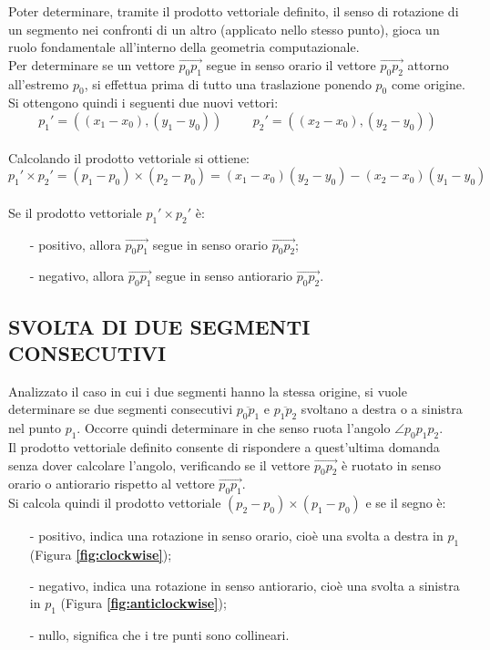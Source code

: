 \documentclass[12pt,a4paper]{report}
\begin{document}
Poter determinare, tramite il prodotto vettoriale definito, il senso di rotazione di un segmento nei confronti di un altro (applicato nello stesso punto), gioca un ruolo fondamentale all'interno della geometria computazionale.\\
Per determinare se un vettore $\overrightarrow{p_0p_1}$ segue in senso orario il vettore $\overrightarrow{p_0p_2}$ attorno all'estremo $p_0$, si effettua prima di tutto una traslazione ponendo $p_0$ come origine.\\
Si ottengono quindi i seguenti due nuovi vettori: 
\[ {p_1}' = ((x_1 - x_0),(y_1 - y_0))
\hspace{1cm}
{p_2}' = ((x_2 - x_0),(y_2 - y_0)) \]\\
Calcolando il prodotto vettoriale si ottiene:
\[{p_1}' \times {p_2}' = (p_1 - p_0) \times (p_2 - p_0) = (x_1 - x_0)(y_2 - y_0) - (x_2 - x_0)(y_1 - y_0)\]\\
Se il prodotto vettoriale ${p_1}' \times {p_2}'$ è:
\begin{itemize}
    \item[-] positivo, allora $\overrightarrow{p_0p_1}$ segue in senso orario $\overrightarrow{p_0p_2}$;
    \item[-] negativo, allora $\overrightarrow{p_0p_1}$ segue in senso antiorario $\overrightarrow{p_0p_2}$.
\end{itemize}

\pagebreak

\subsection*{\small{SVOLTA DI DUE SEGMENTI CONSECUTIVI}}
Analizzato il caso in cui i due segmenti hanno la stessa origine, si vuole determinare se due segmenti consecutivi $\overline{p_0p_1}$ e $\overline{p_1p_2}$ svoltano a destra o a sinistra nel punto $p_1$. Occorre quindi determinare in che senso ruota l'angolo $\angle p_0p_1p_2$.\\
Il prodotto vettoriale definito consente di rispondere a quest'ultima domanda senza dover calcolare l'angolo, verificando se il vettore $\overrightarrow{p_0p_2}$ è ruotato in senso orario o antiorario rispetto al vettore $\overrightarrow{p_0p_1}$.\\
Si calcola quindi il prodotto vettoriale $(p_2 - p_0) \times (p_1 - p_0)$ e se il segno è:
\begin{itemize}
    \item[-] positivo, indica una rotazione in senso orario, cioè una svolta a destra in $p_1$ (Figura \textbf{\ref{fig:clockwise}});
    \item[-] negativo, indica una rotazione in senso antiorario, cioè una svolta a sinistra in $p_1$ (Figura \textbf{\ref{fig:anticlockwise}});
    \item[-] nullo, significa che i tre punti sono collineari. 
\end{itemize}
\end{document}
